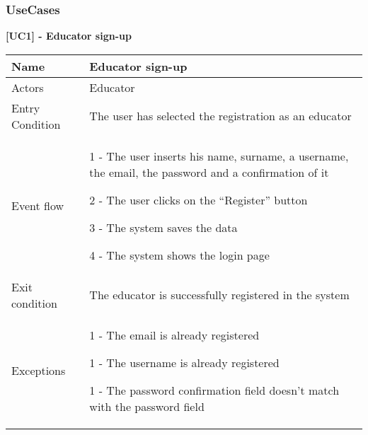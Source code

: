 \subsubsection{UseCases}

    \begin{table}[h]
    \textbf{[UC1] - Educator sign-up}
    
      \centering
      \begin{tabular}{|p{3cm}|p{14cm}|}
        \hline
         Name & Educator sign-up \\
        \hline
        Actors & Educator \\
        \hline
        Entry Condition & The user has selected the registration as an educator \\
        \hline
        Event flow &  1 - The user inserts his name, surname, a username, the email,
        the password and a confirmation of it 
        
        2 - The user clicks on the ``Register'' button

        3 - The system saves the data

        4 - The system shows the login page
        \\
        \hline
        Exit condition & The educator is successfully registered in the system \\
        \hline
        Exceptions & 1 - The email is already registered
        
        1 - The username is already registered 
        
        1 - The password confirmation field doesn't match with the password field\\
        \hline
      \end{tabular}
      
    \end{table}

